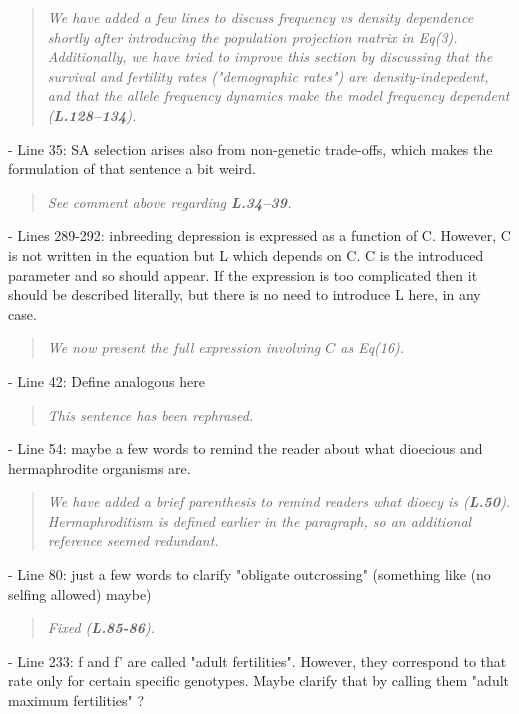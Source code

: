 \documentclass[11pt]{article}
\begin{document}
\begin{quote}
	{\itshape We have added a few lines to discuss frequency vs density dependence shortly after introducing the population projection matrix in Eq(3). Additionally, we have tried to improve this section by discussing that the survival and fertility rates ("demographic rates") are density-indepedent, and that the allele frequency dynamics make the model frequency dependent ({\bf L.128--134}).}
\end{quote}

- Line 35: SA selection arises also from non-genetic trade-offs, which makes the formulation of that sentence a bit weird.

\begin{quote}
	{\itshape See comment above regarding {\bf L.34--39}.}
\end{quote}

- Lines 289-292: inbreeding depression is expressed as a function of C. However, C is not written in the equation but L which depends on C. C is the introduced parameter and so should appear. If the expression is too complicated then it should be described literally, but there is no need to introduce L here, in any case.

\begin{quote}
	{\itshape We now present the full expression involving $C$ as Eq(16).}
\end{quote}

- Line 42: Define analogous here

\begin{quote}
	{\itshape This sentence has been rephrased.}
\end{quote}

- Line 54: maybe a few words to remind the reader about what dioecious and hermaphrodite organisms are.

\begin{quote}
	{\itshape We have added a brief parenthesis to remind readers what dioecy is ({\bf L.50}). Hermaphroditism is defined earlier in the paragraph, so an additional reference seemed redundant.}
\end{quote}

- Line 80: just a few words to clarify "obligate outcrossing" (something like (no selfing allowed) maybe)

\begin{quote}
	{\itshape Fixed ({\bf L.85-86}).}
\end{quote}

- Line 233: f and f’ are called "adult fertilities". However, they correspond to that rate only for certain specific genotypes. Maybe clarify that by calling them "adult maximum fertilities" ?
\end{document}

